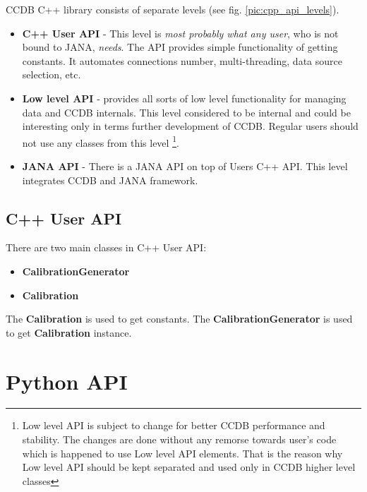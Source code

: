 \documentclass{article}
\begin{document}
CCDB C++ library consists of separate levels (see fig. \ref{pic:cpp_api_levels}).
\begin{itemize}
\item \textbf{C++ User API} - This level is \textit{most probably what any user},
      who is not bound to JANA, \textit{needs}. The API provides simple
      functionality of getting  constants. It automates connections number,
      multi-threading, data source selection, etc.

\item \textbf{Low level API} - provides all sorts of low level functionality for
       managing data and CCDB internals. This level considered to be internal
       and could be interesting only in terms further development of CCDB.
       Regular users should not use any classes from this level
       \footnote{Low level API is subject to change for better CCDB performance
                 and stability. The changes are done without any
                 remorse towards user's code which is happened to use Low
                 level API elements. That is the reason why Low level API
                 should be kept separated and used only in CCDB higher level
                 classes}.

\item \textbf{JANA API} - There is a JANA API on top of Users C++ API. This
      level integrates CCDB and JANA framework.
\end{itemize}


\subsection{C++ User API}

There are two main classes in C++ User API:

\begin{itemize}
  \item \textbf{CalibrationGenerator}
  \item \textbf{Calibration}
\end{itemize}
The \textbf{Calibration} is used to get constants.
The \textbf{CalibrationGenerator} is used to get \textbf{Calibration} instance.


\newpage
\section{Python API}\label{sec:python}
\end{document}
